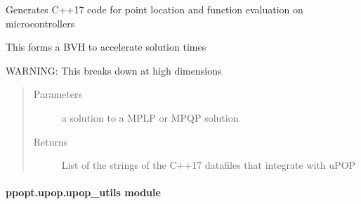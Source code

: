 \documentclass[letterpaper,10pt,english]{sphinxmanual}
\begin{document}
\begin{fulllineitems}
\label{\detokenize{ppopt.upop:ppopt.upop.ucontroller.generate_code}}
\sphinxAtStartPar
Generates C++17 code for point location and function evaluation on microcontrollers

\sphinxAtStartPar
This forms a BVH to accelerate solution times

\sphinxAtStartPar
WARNING: This breaks down at high dimensions
\begin{quote}\begin{description}
\item[{Parameters}] \leavevmode
\sphinxAtStartPar
{} \textendash{} a solution to a MPLP or MPQP solution

\item[{Returns}] \leavevmode
\sphinxAtStartPar
List of the strings of the C++17 datafiles that integrate with uPOP

\end{description}\end{quote}

\end{fulllineitems}



\paragraph{ppopt.upop.upop\_utils module}
\label{\detokenize{ppopt.upop:module-ppopt.upop.upop_utils}}\label{\detokenize{ppopt.upop:ppopt-upop-upop-utils-module}}
\end{document}
